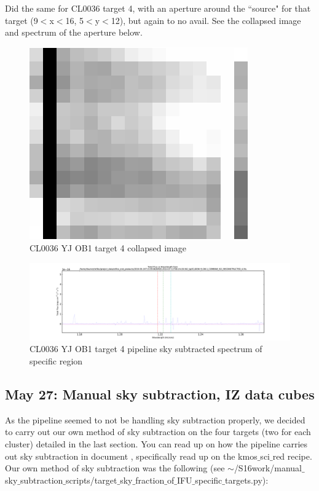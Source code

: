 \documentclass[10pt,letterpaper]{article}
\begin{document}
Did the same for CL0036 target 4, with an aperture around the ``source" for that target (9$<$x$<$16, 5$<$y$<$12), but again to no avail. See the collapsed image and spectrum of the aperture below.\\

\begin{figure}[h!]
\caption{CL0036 YJ OB1 target 4 collapsed image}\label{fig:CL0036 YJ OB1 target 4 collapsed image}
\begin{center}
\includegraphics[scale=0.4]{figures/CL0036_target_4_OB1_collapsed.png}
\end{center}
\end{figure}

\begin{figure}[h!]
\caption{CL0036 YJ OB1 target 4 pipeline sky subtracted spectrum of specific region}\label{fig:CL0036 YJ OB1 target 4 pipeline sky subtracted spectrum of specific region}
\includegraphics[scale=0.4]{figures/CL0036-YJ-OB-1_COMBINE_SCI_RECONSTRUCTED_4_specific_spaxels.pdf}
\end{figure}

\subsection{May 27: Manual sky subtraction, IZ data cubes}
As the pipeline seemed to not be handling sky subtraction properly, we decided to carry out our own method of sky subtraction on the four targets (two for each cluster) detailed in the last section. You can read up on how the pipeline carries out sky subtraction in document \cite{KMOS pipeline manual}, specifically read up on the kmos$\_$sci$\_$red recipe. Our own method of sky subtraction was the following (see $\sim$/S16work/manual$\_$sky$\_$subtraction$\_$scripts/target$\_$sky$\_$fraction$\_$of$\_$IFU$\_$specific$\_$targets.py):\\
\end{document}
